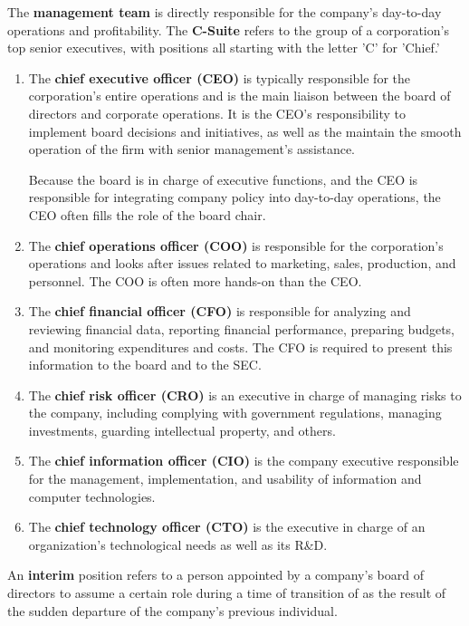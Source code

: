 \documentclass{article}
\begin{document}
    \begin{definition}
      \label{def:management-team}
      The \textbf{management team} is directly responsible for the company's day-to-day operations and profitability. The \textbf{C-Suite} refers to the group of a corporation's top senior executives, with positions all starting with the letter 'C' for 'Chief.'
      \begin{enumerate}
        \item The \textbf{chief executive officer (CEO)} is typically responsible for the corporation's entire operations and is the main liaison between the board of directors and corporate operations. It is the CEO's responsibility to implement board decisions and initiatives, as well as the maintain the smooth operation of the firm with senior management's assistance. 
        
        Because the board is in charge of executive functions, and the CEO is responsible for integrating company policy into day-to-day operations, the CEO often fills the role of the board chair. 
        \item The \textbf{chief operations officer (COO)} is responsible for the corporation's operations and looks after issues related to marketing, sales, production, and personnel. The COO is often more hands-on than the CEO. 
        \item The \textbf{chief financial officer (CFO)} is responsible for analyzing and reviewing financial data, reporting financial performance, preparing budgets, and monitoring expenditures and costs. The CFO is required to present this information to the board and to the SEC. 
        \item The \textbf{chief risk officer (CRO)} is an executive in charge of managing risks to the company, including complying with government regulations, managing investments, guarding intellectual property, and others. 
        \item The \textbf{chief information officer (CIO)} is the company executive responsible for the management, implementation, and usability of information and computer technologies. 
        \item The \textbf{chief technology officer (CTO)} is the executive in charge of an organization's technological needs as well as its R\&D. 
      \end{enumerate}
      An \textbf{interim} position refers to a person appointed by a company's board of directors to assume a certain role during a time of transition of as the result of the sudden departure of the company's previous individual.
    \end{definition}
\end{document}
